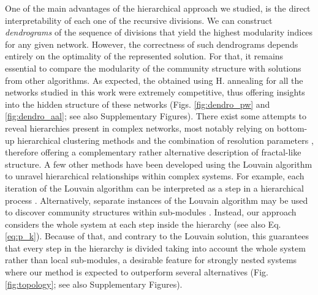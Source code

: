 \documentclass[pdflatex,sn-mathphys-num]{sn-jnl}%
\begin{document}
One of the main advantages of the hierarchical approach we studied, is the direct interpretability of each one of the recursive divisions. We can construct \textit{dendrograms} of the sequence of divisions that yield the highest modularity indices for any given network. However, the correctness of such dendrograms depends entirely on the optimality of the represented solution. For that, it remains essential to compare the modularity of the community structure with solutions from other algorithms. As expected, the obtained using H. annealing for all the networks studied in this work were extremely competitive, thus offering insights into the hidden structure of these networks (Figs. \ref{fig:dendro_pw} and \ref{fig:dendro_aal}; see also Supplementary Figures). There exist some attempts to reveal hierarchies present in complex networks, most notably relying on bottom-up hierarchical clustering methods \cite{SalesPardo-etal_2007,Arenas2008} and the combination of resolution parameters \cite{lambiotte2013multi}, therefore offering a complementary rather alternative description of fractal-like structure. A few other methods have been developed using the Louvain algorithm to unravel hierarchical relationships within complex systems. For example, each iteration of the Louvain algorithm can be interpreted as a step in a hierarchical process \cite{Blondel2008,meunier2009hierarchical}. Alternatively, separate instances of the Louvain algorithm may be used to discover community structures within sub-modules \cite{bassett2010efficient}. Instead, our approach considers the whole system at each step inside the hierarchy \cite{Newman2006,Leicht2008} (see also Eq. \ref{eq:p_k}). Because of that, and contrary to the Louvain solution, this guarantees that every step in the hierarchy is divided taking into account the whole system rather than local sub-modules, a desirable feature for strongly nested systems where our method is expected to outperform several alternatives (Fig. \ref{fig:topology}; see also Supplementary Figures).
\end{document}
